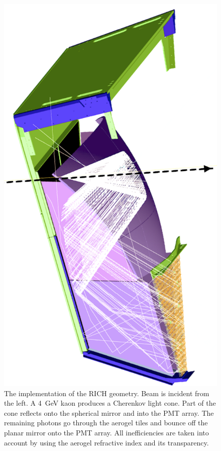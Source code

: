 \begin{figure}
	\centering
	\includegraphics[width=0.99\columnwidth, keepaspectratio]{img/richGeometry.png}
	\caption{The implementation of the RICH geometry. Beam is incident from the left. A 4~GeV kaon produces a
          Cherenkov light cone. Part of the cone reflects onto the spherical mirror and into the PMT array. The remaining
          photons go through the aerogel tiles and bounce off the planar mirror onto the PMT array. All inefficiencies are
          taken into account by using the aerogel refractive index and its transparency.}
	\label{fig:richGeometry}
\end{figure}

